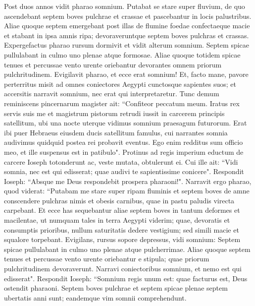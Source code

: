 \begin{biblechapter}  
\verse Post duos annos vidit pharao somnium. Putabat se stare super fluvium,  
\verse de quo ascendebant septem boves pulchrae et crassae et pascebantur in locis palustribus. 
\verse Aliae quoque septem emergebant post illas de flumine foedae confectaeque macie et stabant in ipsa amnis ripa; 
\verse devoraveruntque septem boves pulchras et crassas. Expergefactus pharao 
\verse rursum dormivit et vidit alterum somnium. Septem spicae pullulabant in culmo uno plenae atque formosae.  
\verse Aliae quoque totidem spicae tenues et percussae vento urente oriebantur 
\verse devorantes omnem priorum pulchritudinem. Evigilavit pharao, et ecce erat somnium! 
\verse Et, facto mane, pavore perterritus misit ad omnes coniectores Aegypti cunctosque sapientes suos; et accersitis narravit somnium, nec erat qui interpretaretur. 
\verse Tunc demum reminiscens pincernarum magister ait: “Confiteor peccatum meum. 
\verse Iratus rex servis suis me et magistrum pistorum retrudi iussit in carcerem principis satellitum, 
\verse ubi una nocte uterque vidimus somnium praesagum futurorum. 
\verse Erat ibi puer Hebraeus eiusdem ducis satellitum famulus, cui narrantes somnia 
\verse audivimus quidquid postea rei probavit eventus. Ego enim redditus sum officio meo, et ille suspensus est in patibulo". 
\verse Protinus ad regis imperium eductum de carcere Ioseph totonderunt ac, veste mutata, obtulerunt ei. 
\verse Cui ille ait: “Vidi somnia, nec est qui edisserat; quae audivi te sapientissime conicere". 
\verse Respondit Ioseph: “Absque me Deus respondebit prospera pharaoni!". 
\verse Narravit ergo pharao, quod viderat: “Putabam me stare super ripam fluminis 
\verse et septem boves de amne conscendere pulchras nimis et obesis carnibus, quae in pastu paludis virecta carpebant. 
\verse Et ecce has sequebantur aliae septem boves in tantum deformes et macilentae, ut numquam tales in terra Aegypti viderim; 
\verse quae, devoratis et consumptis prioribus, 
\verse nullum saturitatis dedere vestigium; sed simili macie et squalore torpebant. Evigilans, rursus sopore depressus, 
\verse vidi somnium: Septem spicae pullulabant in culmo uno plenae atque pulcherrimae. 
\verse Aliae quoque septem tenues et percussae vento urente oriebantur e stipula; 
\verse quae priorum pulchritudinem devoraverunt. Narravi coniectoribus somnium, et nemo est qui edisserat". 
\verse Respondit Ioseph: “Somnium regis unum est: quae facturus est, Deus ostendit pharaoni. 
\verse Septem boves pulchrae et septem spicae plenae septem ubertatis anni sunt; eandemque vim somnii comprehendunt. 

\end{biblechapter}
